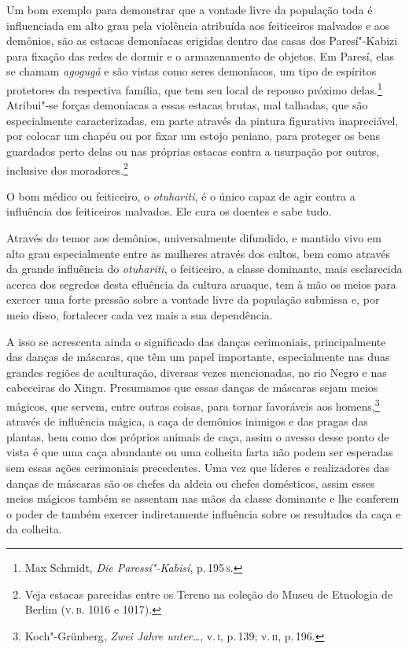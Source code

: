 Um bom exemplo para demonstrar que a vontade livre da população toda é
influenciada em alto grau pela violência atribuída aos feiticeiros
malvados e aos demônios, são as estacas demoníacas erigidas dentro das
casas dos Paresí"-Kabizi para fixação das redes de dormir e o
armazenamento de objetos. Em Paresí, elas se chamam \textit{agogugá} e são
vistas como seres demoníacos, um tipo de espíritos protetores da
respectiva família, que tem seu local de repouso próximo delas.\footnote{Max
  Schmidt, \textit{Die Paressí"-Kabisí}, p.\,195\,\textsc{s}.} Atribui"-se forças
demoníacas a essas estacas brutas, mal talhadas, que são especialmente
caracterizadas, em parte através da pintura figurativa inapreciável, por
colocar um chapéu ou por fixar um estojo peniano, para proteger os bens
guardados perto delas ou nas próprias estacas contra a usurpação por
outros, inclusive dos moradores.\footnote{Veja estacas parecidas entre os
  Tereno na coleção do Museu de Etnologia de Berlim (\textsc{v.\,b.} 1016 e 1017).}

{O bom médico ou feiticeiro, o \textit{otuhariti}, é o único capaz de agir
contra a influência dos feiticeiros malvados. Ele cura os doentes e sabe
tudo.}

Através do temor aos demônios, universalmente difundido, e mantido vivo
em alto grau especialmente entre as mulheres através dos cultos, bem
como através da grande influência do \textit{otuhariti}, o feiticeiro, a
classe dominante, mais esclarecida acerca dos segredos desta efluência
da cultura aruaque, tem à mão os meios para exercer uma forte pressão
sobre a vontade livre da população submissa e, por meio disso,
fortalecer cada vez mais a sua dependência.

A isso se acrescenta ainda o significado das danças cerimoniais,
principalmente das danças de máscaras, que têm um papel importante,
especialmente nas duas grandes regiões de aculturação, diversas vezes
mencionadas, no rio Negro e nas cabeceiras do Xingu. Presumamos que
essas danças de máscaras sejam meios mágicos, que servem, entre outras
coisas, para tornar favoráveis aos homens,\footnote{Koch"-Grünberg,
  \textit{Zwei Jahre unter\ldots}, v.\,\textsc{i}, p.\,139; v.\,\textsc{ii}, p.\,196.}
através de influência mágica, a caça de demônios inimigos e das pragas
das plantas, bem como dos próprios animais de caça, assim o avesso desse
ponto de vista é que uma caça abundante ou uma colheita farta não podem
ser esperadas sem essas ações cerimoniais precedentes. Uma vez que
líderes e realizadores das danças de máscaras são os chefes da aldeia ou
chefes domésticos, assim esses meios mágicos também se assentam nas
mãos da classe dominante e lhe conferem o poder de também exercer
indiretamente influência sobre os resultados da caça e da colheita.

